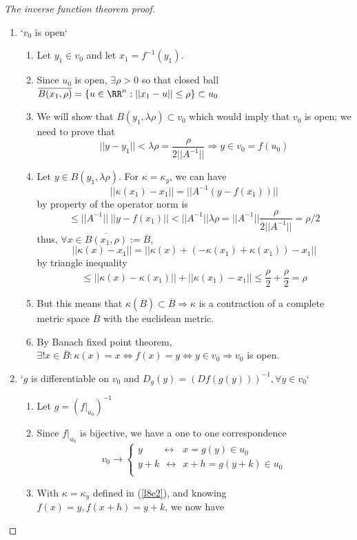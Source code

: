 \begin{proof}[The inverse function theorem proof]
\begin{enumerate}[I]
  \item `$v_0$ is open`
    \begin{enumerate}
    \item Let $y_1 \in v_0$ and let $x_1 = f^{-1}(y_1)$.
    \item Since $u_0$ is open, $\exists \rho > 0$ so that closed ball $\overline{B(x_1, \rho)} = \{u\in \RR^n:||x_1-u|| \leq \rho\} \subset u_0$
    \item We will show that $B(y_1, \lambda \rho) \subset v_0$ which would imply that $v_0$ is open; we need to prove that
      $$||y - y_1|| < \lambda \rho = \frac{\rho}{2||A^{-1}||} \Rightarrow y\in v_0 = f(u_0)$$
    \item Let $y \in B(y_1, \lambda \rho)$. For $\kappa = \kappa_y$, we can have
      $$||\kappa(x_1) - x_1|| = ||A^{-1}(y-f(x_1))||$$
      by property of the operator norm is
      $$\leq ||A^{-1}||\ ||y-f(x_1)|| < ||A^{-1}||\lambda \rho = ||A^{-1}||\frac{\rho}{2||A^{-1}||} = \rho / 2 $$
      thus, $\forall x \in \overline{B(x_1, \rho)} := \overline{B}$,
      $$||\kappa(x)-x_1|| = ||\kappa(x) + (-\kappa(x_1) + \kappa(x_1)) - x_1||$$
      by triangle inequality
      $$\leq ||\kappa(x) - \kappa(x_1)|| + ||\kappa(x_1) - x_1|| \leq \frac{\rho}{2} + \frac{\rho}{2} = \rho$$
    \item But this means that $\kappa(\overline{B}) \subset \overline{B} \Rightarrow \kappa$ is a contraction of a complete metric space $\overline{B}$ with the euclidean metric.
    \item By Banach fixed point theorem, $\exists ! x \in \overline{B} : \kappa(x) = x \iff f(x) = y \iff y \in v_0 \Rightarrow v_0$ is open.
    \end{enumerate}
  \item `$g$ is differentiable on $v_0$ and $D_g(y) = (Df(g(y)))^{-1}, \forall y \in v_0$`
    \begin{enumerate}
    \item Let $g = (f|_{u_0})^{-1}$
    \item Since $f|_{u_0}$ is bijective, we have a one to one correspondence
      $$v_0 \rightarrow
      \begin{cases}
        y \phantom{+ k}\:\:\:\leftrightarrow\:\:\: x = g(y) \in u_0 \\
        y + k \:\:\leftrightarrow\:\: x + h = g(y+k) \in u_0 \\
      \end{cases}
      $$
    \item With $\kappa=\kappa_y$ defined in (\ref{l8e2}), and knowing $f(x) = y, f(x+h) = y+k$, we now have

\end{enumerate}
\end{enumerate}
\end{proof}
